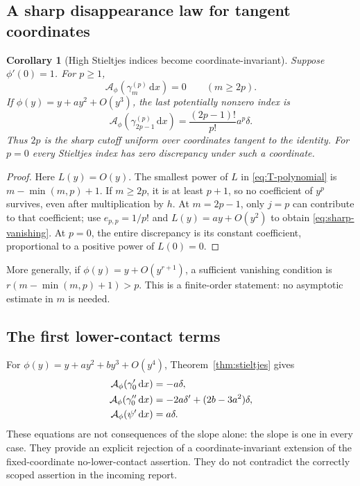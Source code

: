 \documentclass[11pt]{article}
\newtheorem{corollary}[theorem]{Corollary}
\theoremstyle{definition}\newtheorem{definition}[theorem]{Definition}
\theoremstyle{remark}\newtheorem{remark}[theorem]{Remark}
\newcommand{\dd}{\,\mathrm d}
\newcommand{\Ac}{\mathcal A}
\begin{document}
\subsection{A sharp disappearance law for tangent coordinates}
\begin{corollary}[High Stieltjes indices become coordinate-invariant]\label{cor:vanishing}
Suppose $\phi'(0)=1$. For $p\ge1$,
\begin{equation}\label{eq:vanishing}
\Ac_\phi(\gamma_m^{(p)}\dd x)=0\qquad(m\ge2p).
\end{equation}
If $\phi(y)=y+ay^2+O(y^3)$, the last potentially nonzero index is
\begin{equation}\label{eq:sharp-vanishing}
\Ac_\phi(\gamma_{2p-1}^{(p)}\dd x)
=\frac{(2p-1)!}{p!}a^p\delta.
\end{equation}
Thus $2p$ is the sharp cutoff uniform over coordinates tangent to the identity. For $p=0$ every Stieltjes index has zero discrepancy under such a coordinate.
\end{corollary}
\begin{proof}
Here $L(y)=O(y)$. The smallest power of $L$ in \eqref{eq:T-polynomial} is
$m-\min(m,p)+1$. If $m\ge2p$, it is at least $p+1$, so no coefficient of $y^p$ survives, even after multiplication by $h$. At $m=2p-1$, only $j=p$ can contribute to that coefficient; use $e_{p,p}=1/p!$ and $L(y)=ay+O(y^2)$ to obtain \eqref{eq:sharp-vanishing}. At $p=0$, the entire discrepancy is its constant coefficient, proportional to a positive power of $L(0)=0$.
\end{proof}
More generally, if $\phi(y)=y+O(y^{r+1})$, a sufficient vanishing condition is
$r(m-\min(m,p)+1)>p$. This is a finite-order statement: no asymptotic estimate in $m$ is needed.

\subsection{The first lower-contact terms}
For $\phi(y)=y+ay^2+by^3+O(y^4)$, Theorem~\ref{thm:stieltjes} gives
\begin{align}\label{eq:first-contacts}
\Ac_\phi(\gamma_0'\dd x)&=-a\delta,\\
\Ac_\phi(\gamma_0''\dd x)&=-2a\delta'+(2b-3a^2)\delta,\notag\\
\Ac_\phi(\psi'\dd x)&=a\delta.\notag
\end{align}
These equations are not consequences of the slope alone: the slope is one in every case. They provide an explicit rejection of a coordinate-invariant extension of the fixed-coordinate no-lower-contact assertion. They do not contradict the correctly scoped assertion in the incoming report.
\end{document}
